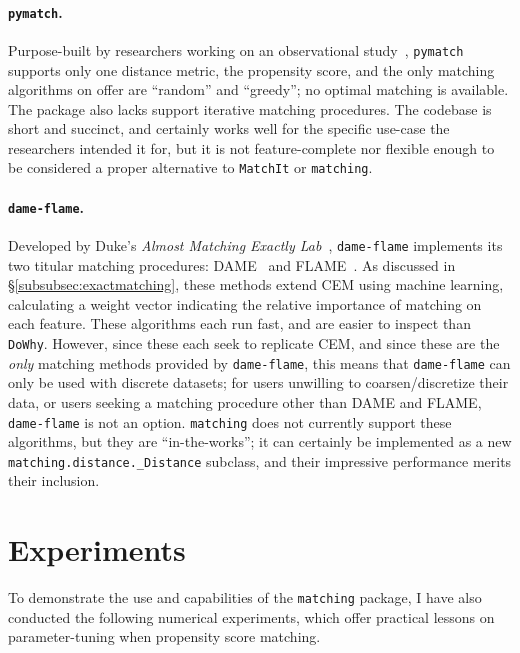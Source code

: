 \documentclass[11pt]{extarticle}
\begin{document}
\paragraph{\texttt{pymatch}.} Purpose-built by researchers working on an observational study~\parencite{miroglio_pymatch_2022}, \texttt{pymatch} supports only one distance metric, the propensity score, and the only matching algorithms on offer are ``random'' and ``greedy''; no optimal matching is available. 
The package also lacks support iterative matching procedures.
The codebase is short and succinct, and certainly works well for the specific use-case the researchers intended it for, but it is not feature-complete nor flexible enough to be considered a proper alternative to \texttt{MatchIt} or \texttt{matching}.

\paragraph{\texttt{dame-flame}.} Developed by Duke's \emph{Almost Matching Exactly Lab}~\parencite{gupta_dame-flame_2021}, \texttt{dame-flame} implements its two titular matching procedures: DAME~\parencite{liu_interpretable_2019} and FLAME~\parencite{wang_flame_2021}. As discussed in \S\ref{subsubsec:exactmatching}, these methods extend CEM using machine learning, calculating a weight vector  indicating the relative importance of matching on each feature. These algorithms each run fast, and are easier to inspect than \texttt{DoWhy}. However, since these each seek to replicate CEM, and since these are the \emph{only} matching methods provided by \texttt{dame-flame}, this means that \texttt{dame-flame} can only be used with discrete datasets; for users unwilling to coarsen/discretize their data, or users seeking a matching procedure other than DAME and FLAME, \texttt{dame-flame} is not an option. \texttt{matching} does not currently support these algorithms, but they are ``in-the-works''; it can certainly be implemented as a new \texttt{matching.distance.\_Distance} subclass, and their impressive performance merits their inclusion.

\section{Experiments}
\label{sec:experiments}

To demonstrate the use and capabilities of the \texttt{matching} package, I have also conducted the following numerical experiments, which offer practical lessons on parameter-tuning when propensity score matching.
\end{document}
